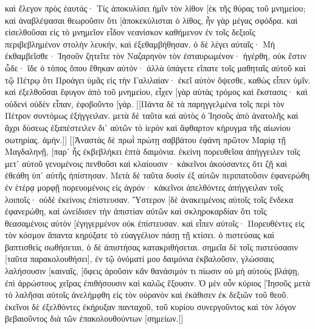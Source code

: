 καὶ ἔλεγον πρὸς ἑαυτάς· Τίς ἀποκυλίσει ἡμῖν τὸν λίθον [ἐκ τῆς θύρας τοῦ μνημείου; 
καὶ ἀναβλέψασαι θεωροῦσιν ὅτι [ἀποκεκύλισται ὁ λίθος, ἦν γὰρ μέγας σφόδρα. 
καὶ εἰσελθοῦσαι εἰς τὸ μνημεῖον εἶδον νεανίσκον καθήμενον ἐν τοῖς δεξιοῖς περιβεβλημένον στολὴν λευκήν, καὶ ἐξεθαμβήθησαν. 
ὁ δὲ λέγει αὐταῖς· Μὴ ἐκθαμβεῖσθε· Ἰησοῦν ζητεῖτε τὸν Ναζαρηνὸν τὸν ἐσταυρωμένον· ἠγέρθη, οὐκ ἔστιν ὧδε· ἴδε ὁ τόπος ὅπου ἔθηκαν αὐτόν· 
ἀλλὰ ὑπάγετε εἴπατε τοῖς μαθηταῖς αὐτοῦ καὶ τῷ Πέτρῳ ὅτι Προάγει ὑμᾶς εἰς τὴν Γαλιλαίαν· ἐκεῖ αὐτὸν ὄψεσθε, καθὼς εἶπεν ὑμῖν. 
καὶ ἐξελθοῦσαι ἔφυγον ἀπὸ τοῦ μνημείου, εἶχεν [γὰρ αὐτὰς τρόμος καὶ ἔκστασις· καὶ οὐδενὶ οὐδὲν εἶπαν, ἐφοβοῦντο [γάρ. [[Πάντα δὲ τὰ παρηγγελμένα τοῖς περὶ τὸν Πέτρον συντόμως ἐξήγγειλαν. μετὰ δὲ ταῦτα καὶ αὐτὸς ὁ Ἰησοῦς ἀπὸ ἀνατολῆς καὶ ἄχρι δύσεως ἐξαπέστειλεν δι᾽ αὐτῶν τὸ ἱερὸν καὶ ἄφθαρτον κήρυγμα τῆς αἰωνίου σωτηρίας. ἀμήν.]] 
[[Ἀναστὰς δὲ πρωῒ πρώτῃ σαββάτου ἐφάνη πρῶτον Μαρίᾳ τῇ Μαγδαληνῇ, [παρ᾽ ἧς ἐκβεβλήκει ἑπτὰ δαιμόνια. 
ἐκείνη πορευθεῖσα ἀπήγγειλεν τοῖς μετ᾽ αὐτοῦ γενομένοις πενθοῦσι καὶ κλαίουσιν· 
κἀκεῖνοι ἀκούσαντες ὅτι ζῇ καὶ ἐθεάθη ὑπ᾽ αὐτῆς ἠπίστησαν. 
Μετὰ δὲ ταῦτα δυσὶν ἐξ αὐτῶν περιπατοῦσιν ἐφανερώθη ἐν ἑτέρᾳ μορφῇ πορευομένοις εἰς ἀγρόν· 
κἀκεῖνοι ἀπελθόντες ἀπήγγειλαν τοῖς λοιποῖς· οὐδὲ ἐκείνοις ἐπίστευσαν. 
Ὕστερον [δὲ ἀνακειμένοις αὐτοῖς τοῖς ἕνδεκα ἐφανερώθη, καὶ ὠνείδισεν τὴν ἀπιστίαν αὐτῶν καὶ σκληροκαρδίαν ὅτι τοῖς θεασαμένοις αὐτὸν [ἐγηγερμένον οὐκ ἐπίστευσαν. 
καὶ εἶπεν αὐτοῖς· Πορευθέντες εἰς τὸν κόσμον ἅπαντα κηρύξατε τὸ εὐαγγέλιον πάσῃ τῇ κτίσει. 
ὁ πιστεύσας καὶ βαπτισθεὶς σωθήσεται, ὁ δὲ ἀπιστήσας κατακριθήσεται. 
σημεῖα δὲ τοῖς πιστεύσασιν [ταῦτα παρακολουθήσει], ἐν τῷ ὀνόματί μου δαιμόνια ἐκβαλοῦσιν, γλώσσαις λαλήσουσιν [καιναῖς, 
[ὄφεις ἀροῦσιν κἂν θανάσιμόν τι πίωσιν οὐ μὴ αὐτοὺς βλάψῃ, ἐπὶ ἀρρώστους χεῖρας ἐπιθήσουσιν καὶ καλῶς ἕξουσιν. 
Ὁ μὲν οὖν κύριος [Ἰησοῦς μετὰ τὸ λαλῆσαι αὐτοῖς ἀνελήμφθη εἰς τὸν οὐρανὸν καὶ ἐκάθισεν ἐκ δεξιῶν τοῦ θεοῦ. 
ἐκεῖνοι δὲ ἐξελθόντες ἐκήρυξαν πανταχοῦ, τοῦ κυρίου συνεργοῦντος καὶ τὸν λόγον βεβαιοῦντος διὰ τῶν ἐπακολουθούντων [σημείων.]] 
